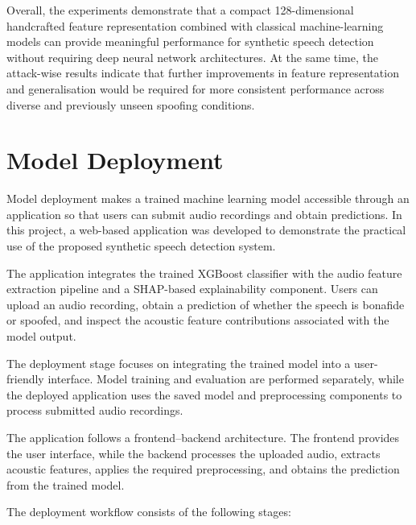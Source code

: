 \documentclass[12pt,a4paper]{report}
\begin{document}
Overall, the experiments demonstrate that a compact 128-dimensional handcrafted feature representation combined with classical machine-learning models can provide meaningful performance for synthetic speech detection without requiring deep neural network architectures. At the same time, the attack-wise results indicate that further improvements in feature representation and generalisation would be required for more consistent performance across diverse and previously unseen spoofing conditions.



\chapter{Model Deployment}

Model deployment makes a trained machine learning model accessible
through an application so that users can submit audio recordings and
obtain predictions. In this project, a web-based application was developed to demonstrate the practical use
of the proposed synthetic speech detection system.

The application integrates the trained XGBoost classifier with the
audio feature extraction pipeline and a SHAP-based explainability
component. Users can upload an audio recording, obtain a prediction
of whether the speech is bonafide or spoofed, and inspect the
acoustic feature contributions associated with the model output.

The deployment stage focuses on integrating the trained model into
a user-friendly interface. Model training and evaluation are
performed separately, while the deployed application uses the
saved model and preprocessing components to process submitted
audio recordings.

The application follows a frontend--backend architecture. The
frontend provides the user interface, while the backend processes
the uploaded audio, extracts acoustic features, applies the
required preprocessing, and obtains the prediction from the
trained model.

The deployment workflow consists of the following stages:
\end{document}
